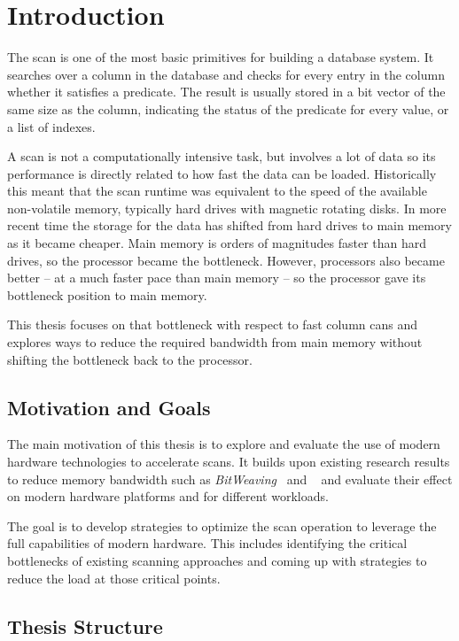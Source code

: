 \chapter{Introduction}

The scan is one of the most basic primitives for building a database system. It
searches over a column in the database and checks for every entry in the column
whether it satisfies a predicate. The result is usually stored in a bit vector
of the same size as the column, indicating the status of the predicate for
every value, or a list of indexes.

A scan is not a computationally intensive task, but involves a lot of data so
its performance is directly related to how fast the data can be loaded.
Historically this meant that the scan runtime was equivalent to the speed of
the available non-volatile memory, typically hard drives with magnetic rotating
disks. In more recent time the storage for the data has shifted from hard
drives to main memory as it became cheaper. Main memory is orders of magnitudes
faster than hard drives, so the processor became the bottleneck. However,
processors also became better -- at a much faster pace than main memory --
so the processor gave its bottleneck position to main memory.

This thesis focuses on that bottleneck with respect to fast column cans and
explores ways to reduce the required bandwidth from main memory without shifting
the bottleneck back to the processor.

\section{Motivation and Goals}

The main motivation of this thesis is to explore and evaluate the use of modern
hardware technologies to accelerate scans. It builds upon existing research
results to reduce memory bandwidth such as \emph{BitWeaving}~\cite{BitWeaving}
and \simdscan{}~\cite{SIMD-Scan} and evaluate their effect on modern hardware
platforms and for different workloads.

The goal is to develop strategies to optimize the scan operation to leverage
the full capabilities of modern hardware. This includes identifying the
critical bottlenecks of existing scanning approaches and coming up with
strategies to reduce the load at those critical points.

\section{Thesis Structure}

